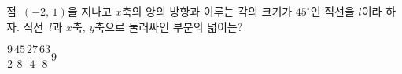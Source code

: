 점~$(-2,\,1)$을 지나고 $x$축의 양의 방향과 이루는 각의 크기가 $45^\circ$인 직선을 $l$이라 하자. 직선~$l$과 $x$축, $y$축으로 둘러싸인 부분의 넓이는?
\begin{choices32}{$\dfrac{9}{2}$}{$\dfrac{45}{8}$}{$\dfrac{27}{4}$}{$\dfrac{63}{8}$}{$9$}\end{choices32}
